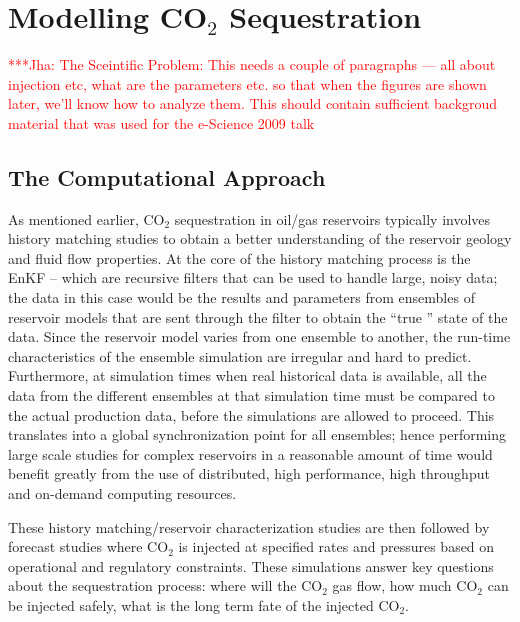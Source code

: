 \documentclass{rspublic}
\newcommand{\jhanote}[1]{ {\textcolor{red} { ***Jha: #1 }}}
\newcommand{\jhanote}[1]{}
\begin{document}
\section{Modelling CO$_2$ Sequestration}


\jhanote{The Sceintific Problem: This needs a couple of paragraphs ---
  all about injection etc, what are the parameters etc. so that when
  the figures are shown later, we'll know how to analyze them. This
  should contain sufficient backgroud material that was used for the
  e-Science 2009 talk}

\subsection{The Computational Approach}

As mentioned earlier, CO$_2$ sequestration in oil/gas reservoirs
typically involves history matching studies to obtain a better
understanding of the reservoir geology and fluid flow properties.
At the core of the history matching process is the EnKF -- 
which are recursive filters that can be used to
handle large, noisy data; the data in this case would be the results
and parameters from ensembles of reservoir models that are sent
through the filter to obtain the ``true '' state of the data. Since
the reservoir model varies from one ensemble to another, the run-time
characteristics of the ensemble simulation are irregular and hard to
predict. Furthermore, at simulation times when real historical data is
available, all the data from the different ensembles at that
simulation time must be compared to the actual production data, before
the simulations are allowed to proceed. This translates into a global
synchronization point for all ensembles; hence performing large scale
studies for complex reservoirs in a reasonable amount of time would
benefit greatly from the use of distributed, high performance, high
throughput and on-demand computing resources.

These history matching/reservoir characterization studies are then
followed by forecast studies where CO$_2$ is injected at specified
rates and pressures based on operational and regulatory constraints.
These simulations answer key questions about the sequestration
process: where will the CO$_2$ gas flow, how much CO$_2$ can be
injected safely, what is the long term fate of the injected CO$_2$.
\end{document}
